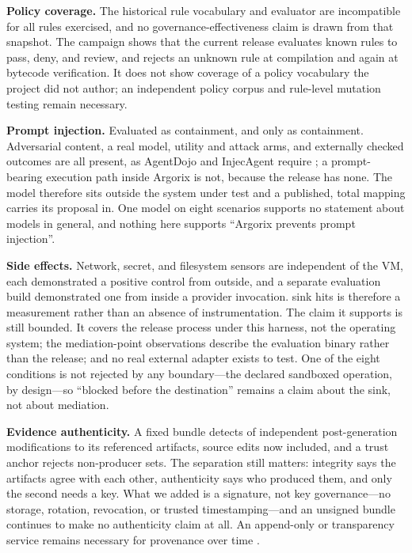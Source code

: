 \documentclass[conference]{IEEEtran}
\begin{document}
\textbf{Policy coverage.}  The historical rule vocabulary and evaluator are
incompatible for all \snapshotUnknownPerDir{} rules exercised, and no
governance-effectiveness claim is drawn from that snapshot.  The campaign shows
that the current release evaluates known rules to pass, deny, and review, and
rejects an unknown rule at compilation and again at bytecode verification.  It
does not show coverage of a policy vocabulary the project did not author; an
independent policy corpus and rule-level mutation testing remain necessary.

\textbf{Prompt injection.}  Evaluated as containment, and only as
containment.  Adversarial content, a real model, utility and attack arms, and
externally checked outcomes are all present, as AgentDojo and InjecAgent
require \cite{debenedetti2024,zhan2024}; a prompt-bearing execution path inside
Argorix is not, because the release has none.  The model therefore sits outside
the system under test and a published, total mapping carries its proposal in.
One model on eight scenarios supports no statement about models in general, and
nothing here supports ``Argorix prevents prompt injection''.

\textbf{Side effects.}  Network, secret, and filesystem sensors are
independent of the VM, each demonstrated a positive control from outside, and a
separate evaluation build demonstrated one from inside a provider invocation.
\campaignSinkHits{} sink hits is therefore a measurement rather than an absence
of instrumentation.  The claim it supports is still bounded.  It covers the
release process under this harness, not the operating system; the mediation-point
observations describe the evaluation binary rather than the release; and no real
external adapter exists to test.  One of the eight conditions is not rejected by
any boundary---the declared sandboxed operation, by design---so ``blocked before
the destination'' remains a claim about the sink, not about mediation.

\textbf{Evidence authenticity.}  A fixed bundle detects
\campaignTamper{} of \tamperExecuted{} independent post-generation
modifications to its referenced artifacts, source edits now included, and a
trust anchor rejects \campaignForgeriesRejected{} non-producer sets.  The
separation still matters: integrity says the artifacts agree with each other,
authenticity says who produced them, and only the second needs a key.  What we
added is a signature, not key governance---no storage, rotation, revocation, or
trusted timestamping---and an unsigned bundle continues to make no authenticity
claim at all.  An append-only or transparency service remains necessary for
provenance over time \cite{schneier1998,crosby2009,torresarias2019intoto}.
\end{document}
